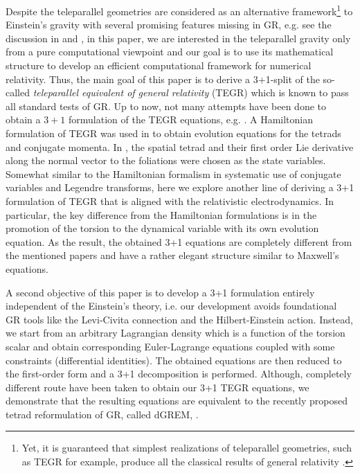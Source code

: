 \documentclass[
10pt, %
a4paper, %
oneside, %
twocolumn,
headinclude,footinclude, %
BCOR5mm, %
]{scrartcl}
\begin{document}
	Despite the teleparallel geometries are considered as an alternative
	framework\footnote{Yet, it is guaranteed that simplest realizations of
	teleparallel geometries, such as TEGR for example, produce all the classical
	results of general relativity \cite{AldrovandiPereiraBook,Bahamonde2021a}.}
	to Einstein's gravity with several promising features missing in GR, e.g.
	see the discussion in \cite[Sec.18]{AldrovandiPereiraBook} and
	\cite{Cai2016}, in this paper, we are interested in the teleparallel gravity
	only from a pure computational viewpoint and our goal is to use its
	mathematical structure to develop an efficient computational framework for
	numerical relativity. Thus, the main goal of this paper is to derive a
	3+1-split of the so-called \emph{teleparallel equivalent of general
	relativity} (TEGR) \cite{AldrovandiPereiraBook,Krssak2019} which is known to
	pass all standard tests of GR. Up to now, not many attempts have been done
	to obtain a $ 3+1 $ formulation of the TEGR equations, e.g.
	\cite{Maluf2001a,Capozziello2021,Pati2022}. A Hamiltonian formulation of
	TEGR was used in \cite{Maluf2001a,Pati2022} to obtain evolution equations
	for the tetrads and conjugate momenta. In \cite{Capozziello2021}, the
	spatial tetrad and their first order Lie derivative along the normal vector
	to the foliations were chosen as the state variables. Somewhat similar to
	the Hamiltonian formalism in systematic use of conjugate variables and
	Legendre transforms, here we explore another line of deriving a 3+1
	formulation of TEGR that is aligned with the relativistic
	electrodynamics. In particular, the key difference from the Hamiltonian
	formulations \cite{Maluf2001a,Pati2022} is in the promotion of the torsion
	to the dynamical variable with its own evolution equation. As the result,
	the obtained 3+1 equations are completely different from the mentioned
	papers and have a rather elegant structure similar to Maxwell's equations.

	A second objective of this paper is to develop a 3+1 formulation entirely
	independent of the Einstein's theory, i.e. our development avoids
	foundational GR tools like the Levi-Civita connection and the
	Hilbert-Einstein action. Instead, we start from an arbitrary Lagrangian
	density which is a function of the torsion scalar and obtain corresponding
	Euler-Lagrange equations coupled with some constraints (differential
	identities). The obtained equations are then reduced to the first-order form
	and a 3+1 decomposition is performed. Although, completely different route
	have been taken to obtain our 3+1 TEGR equations, we demonstrate that the
	resulting equations are equivalent to the recently proposed tetrad
	reformulation of GR, called dGREM, \cite{Olivares2022}.
\end{document}
